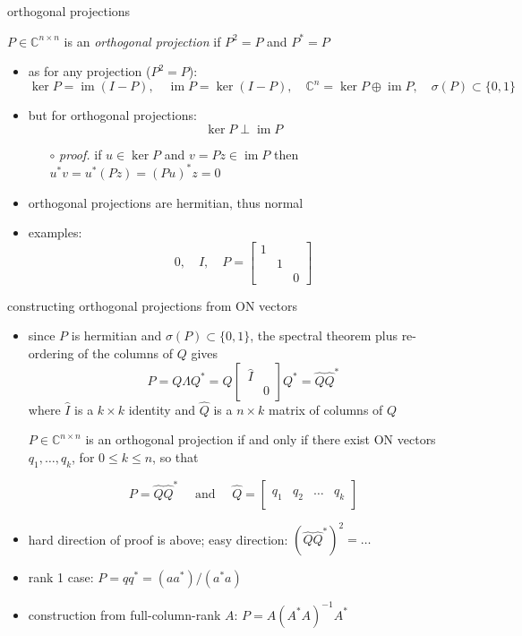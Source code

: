 \documentclass[10pt,hyperref]{beamer}
\newcommand{\CC}{\mathbb{C}}
\newcommand{\image}{\operatorname{im}}
\newcommand{\trefmatrixthree}[3]{\left[\begin{array}{c|c|c|c} & & & \\ #1 & #2 & \dots & #3 \\ & & & \end{array}\right]}
\begin{document}
\begin{frame}{orthogonal projections}

\begin{definition}
$P \in \CC^{n\times n}$ is an \emph{orthogonal projection} if $P^2=P$ and $P^*=P$
\end{definition}

\begin{itemize}
\item as for any projection ($P^2=P$):
    $$\ker P = \image (I-P), \quad \image P = \ker (I-P), \quad \CC^n = \ker P \oplus \image P, \quad \sigma(P) \subset \{0,1\}$$
\item but for orthogonal projections:
    $$\ker P \perp \image P$$

    \begin{itemize}
    \item[$\circ$] \emph{proof.}  if $u\in\ker P$ and $v=Pz\in\image P$ then $u^*v = u^*(Pz)=(Pu)^*z = 0$
    \end{itemize}
\item orthogonal projections are hermitian, thus normal
\item examples:
    $$0, \quad I, \quad P = \begin{bmatrix} 1 & & \\ & 1 & \\ & & 0 \end{bmatrix}$$
\end{itemize}
\end{frame}


\begin{frame}{constructing orthogonal projections from ON vectors}

\begin{itemize}
\item since $P$ is hermitian and $\sigma(P) \subset \{0,1\}$, the spectral theorem plus re-ordering of the columns of $Q$ gives
    $$P=Q \Lambda Q^* = Q \begin{bmatrix} \,\hat I & \\ & 0 \end{bmatrix} Q^* = \hat Q \hat Q^*$$
where $\hat I$ is a $k\times k$ identity and $\hat Q$ is a $n\times k$ matrix of columns of $Q$

\begin{lemma}  $P\in \CC^{n\times n}$ is an orthogonal projection if and only if there exist ON vectors $q_1,\dots,q_k$, for $0 \le k \le n$, so that

\vspace{-3mm}
    $$P = \hat Q \hat Q^* \quad \text{ and } \quad \hat Q = \trefmatrixthree{q_1}{q_2}{q_k}$$
\end{lemma}
\item hard direction of proof is above; easy direction: $(\hat Q\hat Q^*)^2 = \dots$
\item rank 1 case: \quad $P=q q^* = (aa^*)/(a^*a)$
\item construction from full-column-rank $A$: \quad $P = A (A^* A)^{-1} A^*$
\end{itemize}
\end{frame}
\end{document}
